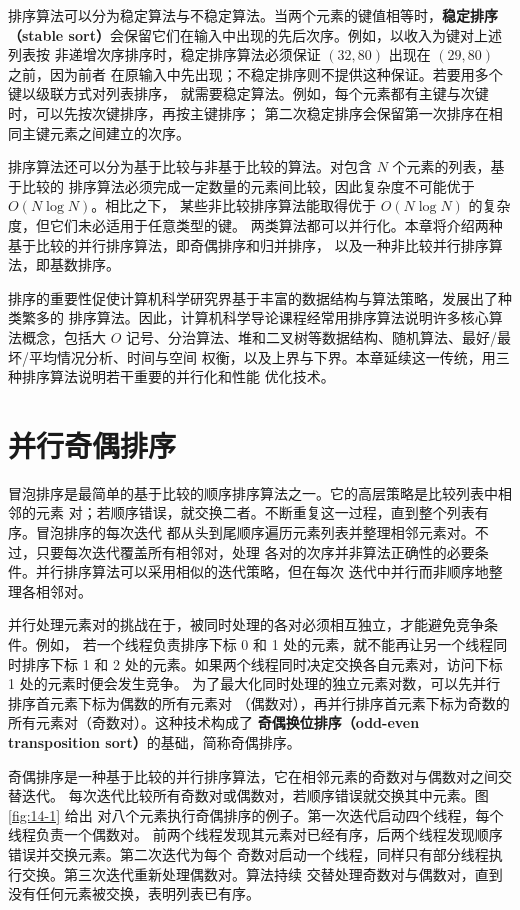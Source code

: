 排序算法可以分为稳定算法与不稳定算法。当两个元素的键值相等时，\textbf{稳定排序
（stable sort）}会保留它们在输入中出现的先后次序。例如，以收入为键对上述列表按
非递增次序排序时，稳定排序算法必须保证 $(32,80)$ 出现在 $(29,80)$ 之前，因为前者
在原输入中先出现；不稳定排序则不提供这种保证。若要用多个键以级联方式对列表排序，
就需要稳定算法。例如，每个元素都有主键与次键时，可以先按次键排序，再按主键排序；
第二次稳定排序会保留第一次排序在相同主键元素之间建立的次序。

排序算法还可以分为基于比较与非基于比较的算法。对包含 $N$ 个元素的列表，基于比较的
排序算法必须完成一定数量的元素间比较，因此复杂度不可能优于 $O(N\log N)$。相比之下，
某些非比较排序算法能取得优于 $O(N\log N)$ 的复杂度，但它们未必适用于任意类型的键。
两类算法都可以并行化。本章将介绍两种基于比较的并行排序算法，即奇偶排序和归并排序，
以及一种非比较并行排序算法，即基数排序。

排序的重要性促使计算机科学研究界基于丰富的数据结构与算法策略，发展出了种类繁多的
排序算法。因此，计算机科学导论课程经常用排序算法说明许多核心算法概念，包括大 $O$
记号、分治算法、堆和二叉树等数据结构、随机算法、最好/最坏/平均情况分析、时间与空间
权衡，以及上界与下界。本章延续这一传统，用三种排序算法说明若干重要的并行化和性能
优化技术\cite{satish2009sorting}。

\section{并行奇偶排序}
\label{sec:parallel-odd-even-sort}

冒泡排序是最简单的基于比较的顺序排序算法之一。它的高层策略是比较列表中相邻的元素
对；若顺序错误，就交换二者。不断重复这一过程，直到整个列表有序。冒泡排序的每次迭代
都从头到尾顺序遍历元素列表并整理相邻元素对。不过，只要每次迭代覆盖所有相邻对，处理
各对的次序并非算法正确性的必要条件。并行排序算法可以采用相似的迭代策略，但在每次
迭代中并行而非顺序地整理各相邻对。

并行处理元素对的挑战在于，被同时处理的各对必须相互独立，才能避免竞争条件。例如，
若一个线程负责排序下标 0 和 1 处的元素，就不能再让另一个线程同时排序下标 1 和 2
处的元素。如果两个线程同时决定交换各自元素对，访问下标 1 处的元素时便会发生竞争。
为了最大化同时处理的独立元素对数，可以先并行排序首元素下标为偶数的所有元素对
（偶数对），再并行排序首元素下标为奇数的所有元素对（奇数对）。这种技术构成了
\textbf{奇偶换位排序（odd-even transposition sort）}的基础，简称奇偶排序。

奇偶排序是一种基于比较的并行排序算法，它在相邻元素的奇数对与偶数对之间交替迭代。
每次迭代比较所有奇数对或偶数对，若顺序错误就交换其中元素。图 \ref{fig:14-1} 给出
对八个元素执行奇偶排序的例子。第一次迭代启动四个线程，每个线程负责一个偶数对。
前两个线程发现其元素对已经有序，后两个线程发现顺序错误并交换元素。第二次迭代为每个
奇数对启动一个线程，同样只有部分线程执行交换。第三次迭代重新处理偶数对。算法持续
交替处理奇数对与偶数对，直到没有任何元素被交换，表明列表已有序。

